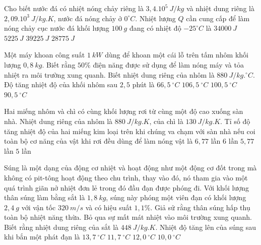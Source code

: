 \begin{ex}
	 Cho biết nước đá có nhiệt nóng chảy riêng là $3,4.10^5\ J/kg$ và nhiệt dung riêng là $2,09.10^3\ J/kg.K$, nước đá nóng chảy ở $0^{\circ}C$. Nhiệt lượng $Q$ cần cung cấp để làm nóng chảy cục nước đá khối lượng $100\ g$ đang có nhiệt độ $-25^{\circ}C$ là
	\choice
	{$34000\ J$}
	{$5225\ J$}
	{\True $39225\ J$}
	{$28775\ J$}	
	\loigiai{}
\end{ex}

\begin{ex}
	Một máy khoan công suất $1\ kW$ dùng để khoan một cái lỗ trên tấm nhôm khối lượng $0,8\ kg$. Biết rằng $50\%$ điện năng được sử dụng để làm nóng máy và tỏa nhiệt ra môi trường xung quanh. Biết nhiệt dung riêng của nhôm là $880\ J/kg.^\circ C$. Độ tăng nhiệt độ của khối nhôm sau $2,5$ phút là
	\choice
	{$66,5\ ^\circ C$}
	{$106,5\ ^\circ C$}
	{$100,5\ ^\circ C$}
	{$90,5\ ^\circ C$}
\end{ex}

\begin{ex}
	Hai miếng nhôm và chì có cùng khối lượng rơi từ cùng một độ cao xuống sàn nhà. Nhiệt dung riêng của nhôm là $880\ J/kg.K$, của chì là $130\ J/kg.K$. Tỉ số độ tăng nhiệt độ của hai miếng kim loại trên khi chúng va chạm với sàn nhà nếu coi toàn bộ cơ năng của vật khi rơi đều dùng để làm nóng vật là
	\choice
	{\True $6,77$ lần}
	{$6$ lần}
	{$5,77$ lần}
	{$5$ lần}
	\loigiai{}
\end{ex}

\begin{ex}
	Súng là một dạng của động cơ nhiệt và hoạt động như một động cơ đốt trong mà không có pit-tông hoạt động theo chu trình, thay vào đó, nó tham gia vào một quá trình giãn nở nhiệt đơn lẻ trong đó đầu đạn được phóng đi. Với khối lượng thân súng làm bằng sắt là $1,8\ kg$, súng này phóng một viên đạn có khối lượng $2,4\ g$ với vận tốc $320\ m/s$ và có hiệu suất $1,1\%$. Giả sử rằng thân súng hấp thụ toàn bộ nhiệt năng thừa. Bỏ qua sự mất mát nhiệt vào môi trường xung quanh. Biết rằng nhiệt dung riêng của sắt là $448\ J/kg.K$. Nhiệt độ tăng lên của súng sau khi bắn một phát đạn là
	\choice
	{\True $13,7\ ^\circ C$}
	{$11,7\ ^\circ C$}
	{$12,0\ ^\circ C$}
	{$10,0\ ^\circ C$}
\end{ex}

